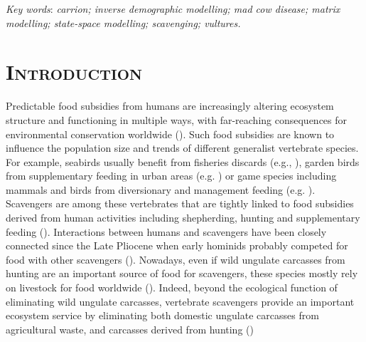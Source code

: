 \documentclass[12pt]{article}
\begin{document}
\textit{Key words}:  \textit{carrion; inverse demographic modelling; mad cow disease; matrix modelling; state-space modelling; scavenging; vultures.}

\vspace*{0.5in}

\section*{\textsc{Introduction}}

Predictable food subsidies from humans are increasingly altering ecosystem structure and functioning in multiple ways, with far-reaching consequences for environmental conservation worldwide (\cite{Oro2013}). Such food subsidies are known to influence the population size and trends of different generalist vertebrate species. For example, seabirds usually benefit from fisheries discards (e.g., \cite{Bicknell2013}), garden birds from supplementary feeding in urban areas (e.g. \cite{Fuller2008}) or game species including mammals and birds from diversionary and management feeding (e.g. \cite{Putman2004}). Scavengers are among these vertebrates that are tightly linked to food subsidies derived from human activities including shepherding, hunting and supplementary feeding (\cite{Donazar1993,Mateo-Tomas2010b,Blanco2014,Cortes-Avizanda2016}). Interactions between humans and scavengers have been closely connected since the Late Pliocene when early hominids probably competed for food with other scavengers (\cite{Moleon2014}). Nowadays, even if wild ungulate carcasses from hunting are an important source of food for scavengers, these species mostly rely on livestock for food worldwide (\cite{Donazar1993,Mateo-Tomas2015,Lambertucci2009,Lambertucci2018}). Indeed, beyond the ecological function of eliminating wild ungulate carcasses, vertebrate scavengers provide an important ecosystem service by eliminating both domestic ungulate carcasses from agricultural waste, and carcasses derived from hunting (\cite{Moleon2014a,Morales-Reyes2015,DeVault2016})\\
\end{document}
